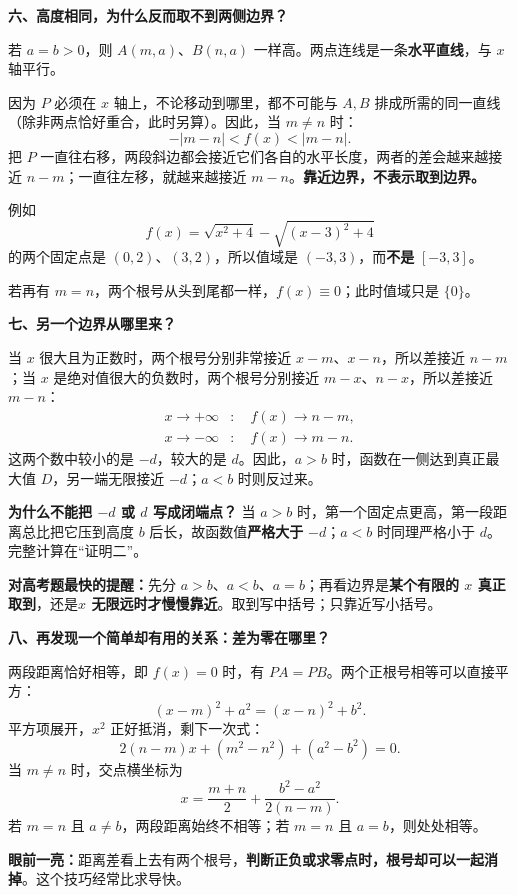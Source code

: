 \begin{explanationbox}
	\textbf{\textcolor{CExplanation}{六、高度相同，为什么反而取不到两侧边界？}}

	若 $a=b>0$，则 $A(m,a)$、$B(n,a)$ 一样高。两点连线是一条\textbf{水平直线}，与 $x$ 轴平行。
	

	因为 $P$ 必须在 $x$ 轴上，不论移动到哪里，都不可能与 $A,B$ 排成所需的同一直线（除非两点恰好重合，此时另算）。因此，当 $m\ne n$ 时：
	\[
		\boxed{-|m-n|<f(x)<|m-n|}.
	\]
	把 $P$ 一直往右移，两段斜边都会接近它们各自的水平长度，两者的差会越来越接近 $n-m$；一直往左移，就越来越接近 $m-n$。\textbf{靠近边界，不表示取到边界。}

	例如
	\[
		f(x)=\sqrt{x^2+4}-\sqrt{(x-3)^2+4}
	\]
	的两个固定点是 $(0,2)$、$(3,2)$，所以值域是 $(-3,3)$，而\textbf{不是} $[-3,3]$。

	若再有 $m=n$，两个根号从头到尾都一样，$f(x)\equiv0$；此时值域只是 $\{0\}$。
\end{explanationbox}
\clearpage
\begin{explanationbox}
	\textbf{\textcolor{CExplanation}{七、另一个边界从哪里来？}}



	当 $x$ 很大且为正数时，两个根号分别非常接近 $x-m$、$x-n$，所以差接近 $n-m$；当 $x$ 是绝对值很大的负数时，两个根号分别接近 $m-x$、$n-x$，所以差接近 $m-n$：
	\[
		\boxed{\begin{aligned}
				x\to+\infty & :\quad f(x)\to n-m, \\
				x\to-\infty & :\quad f(x)\to m-n.
			\end{aligned}}
	\]
	这两个数中较小的是 $-d$，较大的是 $d$。因此，$a>b$ 时，函数在一侧达到真正最大值 $D$，另一端无限接近 $-d$；$a<b$ 时则反过来。

	\textbf{为什么不能把 $-d$ 或 $d$ 写成闭端点？} 当 $a>b$ 时，第一个固定点更高，第一段距离总比把它压到高度 $b$ 后长，故函数值\textbf{严格大于} $-d$；$a<b$ 时同理严格小于 $d$。完整计算在“证明二”。

	\textbf{对高考题最快的提醒：}先分 $a>b$、$a<b$、$a=b$；再看边界是\textbf{某个有限的 $x$ 真正取到}，还是\textbf{$x$ 无限远时才慢慢靠近}。取到写中括号；只靠近写小括号。
\end{explanationbox}
\clearpage
\begin{explanationbox}
	\textbf{\textcolor{CExplanation}{八、再发现一个简单却有用的关系：差为零在哪里？}}



	两段距离恰好相等，即 $f(x)=0$ 时，有 $PA=PB$。两个正根号相等可以直接平方：
	\[
		(x-m)^2+a^2=(x-n)^2+b^2.
	\]
	平方项展开，$x^2$ 正好抵消，剩下一次式：
	\[
		2(n-m)x+(m^2-n^2)+(a^2-b^2)=0.
	\]
	当 $m\ne n$ 时，交点横坐标为
	\[
		\boxed{x=\frac{m+n}{2}+\frac{b^2-a^2}{2(n-m)}}.
	\]
	若 $m=n$ 且 $a\ne b$，两段距离始终不相等；若 $m=n$ 且 $a=b$，则处处相等。

	\textbf{眼前一亮：}距离差看上去有两个根号，\textbf{判断正负或求零点时，根号却可以一起消掉}。这个技巧经常比求导快。
\end{explanationbox}
